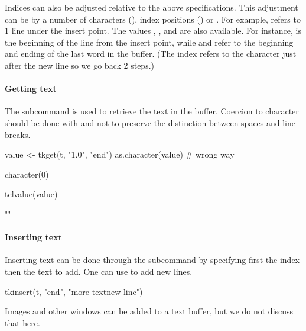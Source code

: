 Indices can also be adjusted relative to the above
specifications. This adjustment can be by a number of characters
(), index positions () or . For
example,  refers to 1 line under the insert
point. The values , , 
and  are also available. For instance,  is the beginning of the line from the insert point, while
 and  refer to the
beginning and ending of the last word in the buffer. (The 
index refers to the character just after the new line so we go back 2
steps.)

\paragraph{Getting text}
The  subcommand is used to retrieve the text
in the buffer. Coercion to character should be done with
 and not  to preserve the
distinction between spaces and line breaks.

\begin{Schunk}
\begin{Sinput}
 value <- tkget(t, "1.0", "end")
 as.character(value)                     # wrong way
\end{Sinput}
\begin{Soutput}
character(0)
\end{Soutput}
\begin{Sinput}
 tclvalue(value)
\end{Sinput}
\begin{Soutput}
[1] "\n"
\end{Soutput}
\end{Schunk}

\paragraph{Inserting text}
Inserting text can be done through the 
subcommand by specifying first the index then the text to add. One can
use  to add new lines.
\begin{Schunk}
\begin{Sinput}
 tkinsert(t, "end", "more text\n new line")  
\end{Sinput}
\end{Schunk}
Images and other windows can be added to a text buffer, but we do not discuss that here.

